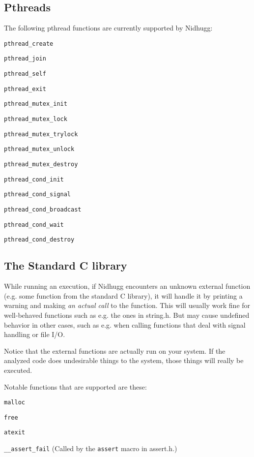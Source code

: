 \documentclass[a4paper]{article}
\begin{document}
\subsection{Pthreads}

The following pthread functions are currently supported by Nidhugg:

\begin{description}
\item{\texttt{pthread\_create}}
\item{\texttt{pthread\_join}}
\item{\texttt{pthread\_self}}
\item{\texttt{pthread\_exit}}
\item{\texttt{pthread\_mutex\_init}}
\item{\texttt{pthread\_mutex\_lock}}
\item{\texttt{pthread\_mutex\_trylock}}
\item{\texttt{pthread\_mutex\_unlock}}
\item{\texttt{pthread\_mutex\_destroy}}
\item{\texttt{pthread\_cond\_init}}
\item{\texttt{pthread\_cond\_signal}}
\item{\texttt{pthread\_cond\_broadcast}}
\item{\texttt{pthread\_cond\_wait}}
\item{\texttt{pthread\_cond\_destroy}}
\end{description}

\subsection{The Standard C library}

While running an execution, if Nidhugg encounters an unknown external
function (e.g. some function from the standard C library), it will
handle it by printing a warning and making \emph{an actual call} to
the function. This will usually work fine for well-behaved functions
such as e.g. the ones in \textsf{string.h}. But may cause undefined
behavior in other cases, such as e.g. when calling functions that deal
with signal handling or file I/O.

Notice that the external functions are actually run on your system. If
the analyzed code does undesirable things to the system, those things
will really be executed.

Notable functions that are supported are these:

\begin{description}
\item{\texttt{malloc}}
\item{\texttt{free}}
\item{\texttt{atexit}}
\item{\texttt{\_\_assert\_fail}} (Called by the \texttt{assert} macro
  in \textsf{assert.h}.)
\end{description}
\end{document}
